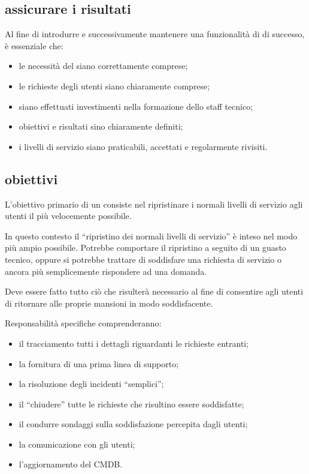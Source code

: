 \subsection[Assicurare i risultati]{assicurare i risultati}
\label{sd-ensuring-results}
Al fine di introdurre e successivamente mantenere una funzionalità di  di successo, è essenziale che:

\begin{itemize}
\item{le necessità del  siano correttamente comprese;}
\item{le richieste degli utenti siano chiaramente comprese;}
\item{siano effettuati investimenti nella formazione dello staff tecnico;}
\item{obiettivi e risultati sino chiaramente definiti;}
\item{i livelli di servizio siano praticabili, accettati e regolarmente rivisiti.}
\end{itemize}

\subsection[Obiettivi]{obiettivi}
\label{sd-objectives}
L'obiettivo primario di un  consiste nel ripristinare i normali livelli di servizio agli utenti il più velocemente possibile. 

In questo contesto il ``ripristino dei normali livelli di servizio'' è inteso nel modo più ampio possibile. Potrebbe comportare il ripristino a seguito di un guasto tecnico, oppure si potrebbe trattare di soddisfare una richiesta di servizio o ancora più semplicemente rispondere ad una domanda. 

Deve essere fatto tutto ciò che risulterà necessario al fine di consentire agli utenti di ritornare alle proprie mansioni in modo soddisfacente.

Responsabilità specifiche comprenderanno:

\begin{itemize}
\item{il tracciamento tutti i dettagli riguardanti le richieste entranti;}
\item{la fornitura di una prima linea di supporto;}
\item{la risoluzione degli incidenti ``semplici'';}
\item{il ``chiudere'' tutte le richieste che risultino essere soddisfatte;}
\item{il condurre sondaggi sulla soddisfazione percepita dagli utenti;}
\item{la comunicazione con gli utenti;}
\item{l'aggiornamento del \ac{CMDB}.}
\end{itemize}

